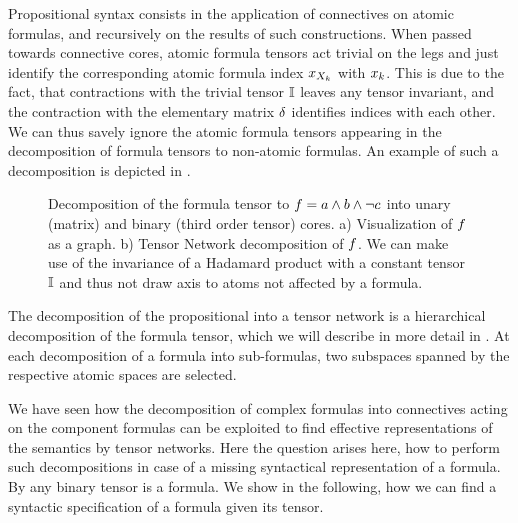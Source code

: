 Propositional syntax consists in the application of connectives on atomic formulas, and recursively on the results of such constructions.
When passed towards connective cores, atomic formula tensors act trivial on the legs and just identify the corresponding atomic formula index $x_{X_{k}}$ with $x_{k}$.
This is due to the fact, that contractions with the trivial tensor $\mathbb{I}$ leaves any tensor invariant, and the contraction with the elementary matrix $\delta$ identifies indices with each other.
We can thus savely ignore the atomic formula tensors appearing in the decomposition of formula tensors to non-atomic formulas.
An example of such a decomposition is depicted in .

\begin{figure}[h]
\begin{center}
	
\end{center}
\caption{Decomposition of the formula tensor to $f = a \land b \land \lnot c$ into unary (matrix) and binary (third order tensor) cores.
	a) Visualization of $f$ as a graph. %
	b) Tensor Network decomposition of $f$.
	We can make use of the invariance of a Hadamard product with a constant tensor $\mathbb{I}$ and thus not draw axis to atoms not affected by a formula.}
\label{fig:decompositionExample}
\end{figure}

\begin{remark}
	The decomposition of the propositional into a tensor network is a hierarchical decomposition of the formula tensor, which we will describe in more detail in .
	At each decomposition of a formula into sub-formulas, two subspaces spanned by the respective atomic spaces are selected. 
\end{remark}


\label{sec:termClauseDecomposition}

We have seen how the decomposition of complex formulas into connectives acting on the component formulas can be exploited to find effective representations of the semantics by tensor networks.
Here the question arises here, how to perform such decompositions in case of a missing syntactical representation of a formula.
By  any binary tensor is a formula.
We show in the following, how we can find a syntactic specification of a formula given its tensor.

